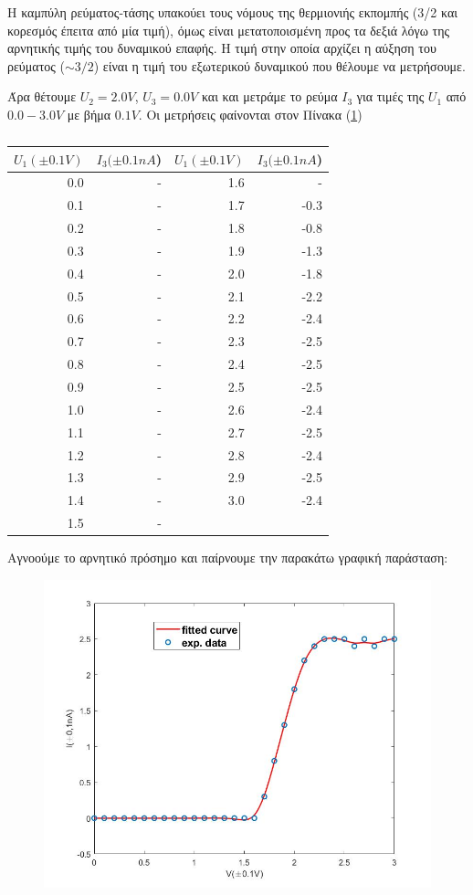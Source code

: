 \documentclass[a4paper]{article}
\begin{document}
	Η καμπύλη ρεύματος-τάσης υπακούει τους νόμους της θερμιονιής εκπομπής (3/2 και κορεσμός έπειτα από μία τιμή), όμως είναι μετατοποισμένη προς τα δεξιά λόγω της αρνητικής τιμής του δυναμικού επαφής. Η τιμή στην οποία αρχίζει η αύξηση του ρεύματος ($\sim 3/2$) είναι η τιμή του εξωτερικού δυναμικού που θέλουμε να μετρήσουμε. 	
	
	
	 	Άρα θέτουμε $U_2=2.0V$, $U_3=0.0V$ και και μετράμε το ρεύμα $I_3$ για τιμές της $U_1$ από $0.0 - 3.0 V$ με βήμα $0.1V$.
	 	Οι μετρήσεις φαίνονται στον Πίνακα (\ref{mat1})
	 	
	 	
	 	
	 	\begin{table}
	 	    \centering
	 		\begin{tabular}{r|r|||r|r}
	 		$U_1(\pm0.1V)$ & $I_3(\pm0.1nA$) &$U_1(\pm0.1V)$ & $I_3(\pm0.1nA$)\\ \hline\hline
0.0&-&1.6&-\\
0.1&-&1.7&-0.3\\
0.2&-&1.8&-0.8\\
0.3&-&1.9&-1.3\\
0.4&-&2.0&-1.8\\
0.5&-&2.1&-2.2\\
0.6&-&2.2&-2.4\\
0.7&-&2.3&-2.5\\
0.8&-&2.4&-2.5\\
0.9&-&2.5&-2.5\\
1.0&-&2.6&-2.4\\
1.1&-&2.7&-2.5\\
1.2&-&2.8&-2.4\\
1.3&-&2.9&-2.5\\
1.4&-&3.0&-2.4\\
1.5&-& & 
	 		\end{tabular}
	 		\caption{ }
	 		\label{mat1}
	 	\end{table}
	 	
	 	Αγνοούμε το αρνητικό πρόσημο και παίρνουμε την παρακάτω γραφική παράσταση: 
	 	
	 	\begin{figure}[h!]
	 		\centering
	 		\includegraphics[width=0.9\linewidth]{plot1.jpg}
	 		\caption{ }
	 		\label{im1}
	 	\end{figure}
	 	
\end{document}
